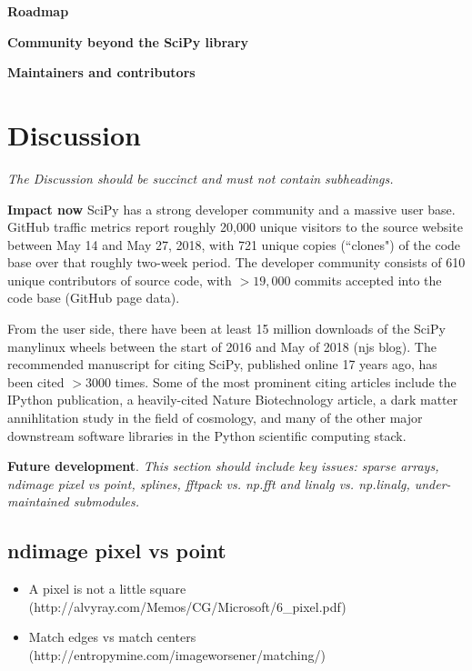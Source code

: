 \documentclass[fleqn,10pt]{wlscirep}
\begin{document}
\textbf{Roadmap}

\textbf{Community beyond the SciPy library}

\textbf{Maintainers and contributors}


\section*{Discussion}

\textit{The Discussion should be succinct and must not contain subheadings.}

\textbf{Impact now}
SciPy has a strong developer community and a massive user base. GitHub
traffic metrics report roughly 20,000 unique visitors to the source
website between May 14 and May 27, 2018, with 721 unique copies (``clones")
of the code base over that roughly two-week period. The developer community
consists of 610 unique contributors of source code, with $>19,000$ commits
accepted into the code base (GitHub page data).

%
%
From the user side, there have been at least 15 million downloads
of the SciPy manylinux wheels between the start of 2016 and May of 2018
(njs blog). The recommended manuscript for citing SciPy,
published online 17 years ago, has been cited $>3000$
times. Some of the most prominent citing articles include the IPython
publication, a heavily-cited Nature Biotechnology article, a dark
matter annihlitation study in the field of cosmology, and many of the
other major downstream software libraries in the Python scientific
computing stack.

\textbf{Future development}.
\textit{This section should include key issues: sparse arrays, ndimage pixel vs point, splines, fftpack vs. np.fft and linalg vs. np.linalg, under-maintained submodules.}

\subsection*{ndimage pixel vs point}

\begin{itemize}
  \item A pixel is not a little square
    (http://alvyray.com/Memos/CG/Microsoft/6\_pixel.pdf)
  \item Match edges vs match centers
    (http://entropymine.com/imageworsener/matching/)
\end{itemize}
\end{document}
